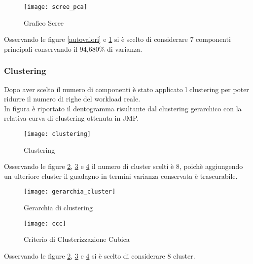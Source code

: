 \begin{figure}[!htbp]
  \centering
  \texttt{[image: scree\_pca]}
  \caption{Grafico Scree}
  \label{scree_pca}
\end{figure}

Osservando le figure \ref{autovalori} e \ref{scree_pca} si è scelto di considerare
7 componenti principali conservando il 94,680\% di varianza.
\clearpage
\subsubsection{Clustering}

Dopo aver scelto il numero di componenti è stato applicato l clustering per poter
ridurre il numero di righe del workload reale.\\
In figura è riportato il dentogramma risultante dal clustering gerarchico con
la relativa curva di clustering ottenuta in JMP.\\

\begin{figure}[!htbp]
  \centering
  \texttt{[image: clustering]}
  \caption{Clustering}
  \label{clustering}
\end{figure}
\clearpage

Osservando le figure \ref{clustering}, \ref{gerarchia_cluster} e \ref{ccc}
il numero di cluster scelti è 8, poichè aggiungendo un ulteriore cluster il guadagno
in termini varianza conservata è trascurabile.

\begin{minipage}{\linewidth}
 \centering
 \begin{minipage}{0.48\linewidth}
   \begin{figure}[H]
     \texttt{[image: gerarchia\_cluster]}
     \label{gerarchia_cluster}
     \caption{Gerarchia di clustering}
   \end{figure}
 \end{minipage}
 \begin{minipage}{0.48\linewidth}
   \begin{figure}[H]
     \texttt{[image: ccc]}
     \label{ccc}
     \caption{Criterio di Clusterizzazione Cubica}
   \end{figure}
 \end{minipage}
\end{minipage}

Osservando le figure \ref{clustering}, \ref{gerarchia_cluster} e \ref{ccc} si è
scelto di considerare 8 cluster.
\clearpage
